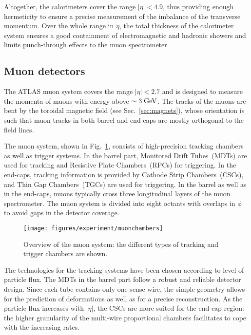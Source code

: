 Altogether, the calorimeters cover the range \mbox{$|\eta| < 4.9$},
thus providing enough hermeticity to ensure a precise measurement
of the imbalance of the transverse momentum.
Over the whole range in $\eta$, the total thickness of the calorimeter
system ensures a good containment of
electromagnetic and hadronic showers and limits punch-through effects to the muon spectrometer.

\subsection{Muon detectors}
\label{sec:muonspectrometer}

The ATLAS muon system covers the range \mbox{$|\eta| < 2.7$} and is
designed to measure the momenta of muons with energy above \mbox{$\sim
  3 \; \mathrm{GeV}$}. 
The tracks of the muons are bent by the toroidal magnetic field (see
Sec.~\ref{sec:magnets}), whose orientation is such that muon tracks in
both barrel and end-caps are mostly orthogonal to the field lines.

The muon system, shown in Fig.~\ref{fig:muons}, consists of
high-precision tracking chambers as well as trigger systems.
In the barrel part, Monitored Drift Tubes~(MDTs) are used for tracking
and Resistive Plate Chambers~(RPCs) for triggering.
In the end-caps, tracking information is provided by Cathode Strip
Chambers~(CSCs), and Thin Gap Chambers~(TGCs) are used for
triggering.
In the barrel as well as in the end-caps, muons typically cross three
longitudinal layers of the muon spectrometer.
The muon system is divided into eight octants with overlaps in $\phi$
to avoid gaps in the detector coverage.

\begin{figure}[ht]
\begin{center}
\texttt{[image: figures/experiment/muonchambers]}
\caption[Overview of the muon system]{
  Overview of the muon system:
  the different types of tracking and trigger chambers are shown.}
\label{fig:muons}
\end{center}
\end{figure}

The technologies for the tracking systems have been chosen according to
level of particle flux.
The MDTs in the barrel part follow a robust and reliable detector design.
Since each tube contains only one sense wire, the simple geometry
allows for the prediction of deformations as well as for a precise
reconstruction.
As the particle flux increases with $|\eta|$, the CSCs are more suited
for the end-cap region: the higher granularity of the multi-wire
proportional chambers facilitates to cope with the increasing rates. 

